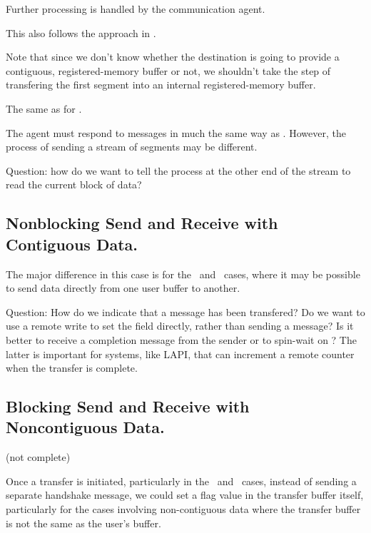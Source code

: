 Further processing is handled by the communication agent.


This also follows the approach in \tcpname.

Note that since we don't know whether the destination is going to provide a
contiguous, registered-memory buffer or not, we shouldn't take the step of
transfering the first segment into an internal registered-memory buffer.


The same as for \tcpname.  


The agent must respond to messages in much the same way as \tcpname.  However,
the process of sending a stream of segments may be different. 

Question: how do we want to tell the process at the other end of the stream to
read the current block of data?

\subsection{Nonblocking Send and Receive with Contiguous Data.}

The major difference in this case is for the \shmemname\ and \vianame\ cases,
where it may be possible to send data directly from one user buffer to
another.  

\begin{via}
  Question: How do we indicate that a message has been transfered?  Do we want
  to use a remote write to set the  field
  directly, rather than sending a message?  Is it better to receive a
  completion message from the sender or to spin-wait on
  ?   The latter is important for systems,
  like LAPI, that can increment a remote counter when the transfer is
  complete.  

\end{via}

\subsection{Blocking Send and Receive with Noncontiguous Data.}
\label{sec:blocking-optimization}
(not complete)

Once a transfer is initiated, particularly in the \shmemname\ and 
\vianame\ cases, instead of sending a separate handshake message, we could set
a flag 
value in the transfer buffer itself, particularly for the cases involving
non-contiguous data where the transfer buffer is not the same as the user's
buffer.  

